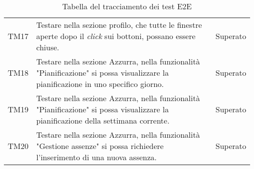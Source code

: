 \begin{table}[h]
\begin{tabularx}{\textwidth}{c X c}
		TM17 & Testare nella sezione profilo, che tutte le finestre aperte dopo il \emph{click} sui bottoni, possano essere chiuse. & Superato\\
		TM18 & Testare nella sezione Azzurra, nella funzionalità "Pianificazione" si possa visualizzare la pianificazione in uno specifico giorno. & Superato\\
		TM19 & Testare nella sezione Azzurra, nella funzionalità "Pianificazione" si possa visualizzare la pianificazione della settimana corrente. & Superato\\
		TM20 & Testare nella sezione Azzurra, nella funzionalità "Gestione assenze" si possa richiedere l'inserimento di una nuova assenza. & Superato\\
		\hline
	\end{tabularx} \hbox{}
	\caption{Tabella del tracciamento dei test E2E}
\end{table}%

